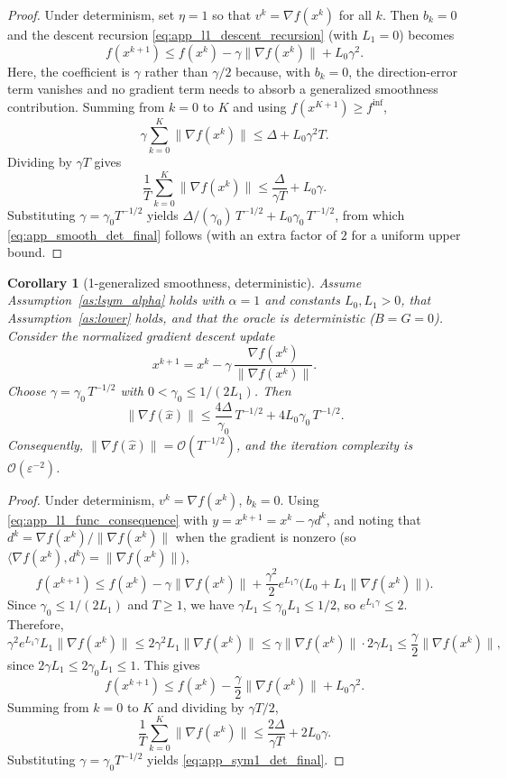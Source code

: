 \documentclass[letter,11pt]{article}
\newtheorem{corollary}{Corollary}[theorem]
\newcommand{\Ocal}{\mathcal{O}}
\begin{document}
\begin{proof}
Under determinism, set $\eta=1$ so that $v^k=\nabla f(x^k)$ for all $k$.
Then $b_k=0$ and the descent recursion
\eqref{eq:app_l1_descent_recursion} (with $L_1=0$) becomes
\[
    f(x^{k+1})
    \le f(x^k) - \gamma\|\nabla f(x^k)\| + L_0\gamma^2.
\]
Here, the coefficient is $\gamma$ rather than $\gamma/2$ because, with
$b_k=0$, the direction-error term vanishes and no gradient term needs to
absorb a generalized smoothness contribution. Summing from $k=0$ to $K$
and using $f(x^{K+1})\ge f^{\inf}$,
\[
    \gamma\sum_{k=0}^K \|\nabla f(x^k)\|
    \le \Delta + L_0\gamma^2 T.
\]
Dividing by $\gamma T$ gives
\[
    \frac{1}{T}\sum_{k=0}^K \|\nabla f(x^k)\|
    \le \frac{\Delta}{\gamma T} + L_0\gamma.
\]
Substituting $\gamma=\gamma_0 T^{-1/2}$ yields
$\Delta/(\gamma_0)\,T^{-1/2} + L_0\gamma_0\,T^{-1/2}$, from which
\eqref{eq:app_smooth_det_final} follows (with an extra factor of $2$ for
a uniform upper bound.
\end{proof}

\begin{corollary}[1-generalized smoothness, deterministic]
\label{cor:app_nsgdm_sym1_det}
Assume Assumption~\ref{as:lsym_alpha} holds with $\alpha=1$ and constants
$L_0,L_1>0$, that Assumption~\ref{as:lower} holds, and that the oracle is
deterministic ($B=G=0$). Consider the normalized gradient descent update
\[
    x^{k+1} = x^k - \gamma\,\frac{\nabla f(x^k)}{\|\nabla f(x^k)\|}.
\]
Choose $\gamma = \gamma_0\,T^{-1/2}$ with
$0<\gamma_0\le 1/(2L_1)$. Then
\begin{equation}
\label{eq:app_sym1_det_final}
    \|\nabla f(\widehat x)\|
    \le
    \frac{4\Delta}{\gamma_0}\,T^{-1/2}
    + 4L_0\gamma_0\,T^{-1/2}.
\end{equation}
Consequently,
$\|\nabla f(\widehat x)\| = \Ocal(T^{-1/2})$,
and the iteration complexity is $\Ocal(\varepsilon^{-2})$.
\end{corollary}

\begin{proof}
Under determinism, $v^k=\nabla f(x^k)$, $b_k=0$.
Using \eqref{eq:app_l1_func_consequence} with $y=x^{k+1}=x^k-\gamma d^k$,
and noting that $d^k=\nabla f(x^k)/\|\nabla f(x^k)\|$ when the gradient is
nonzero (so $\langle\nabla f(x^k),d^k\rangle=\|\nabla f(x^k)\|$),
\[
    f(x^{k+1})
    \le f(x^k)
    - \gamma\|\nabla f(x^k)\|
    + \frac{\gamma^2}{2}e^{L_1\gamma}
    \bigl(L_0+L_1\|\nabla f(x^k)\|\bigr).
\]
Since $\gamma_0\le 1/(2L_1)$ and $T\ge1$, we have
$\gamma L_1\le\gamma_0 L_1\le 1/2$, so $e^{L_1\gamma}\le 2$. Therefore,
\[
    \gamma^2 e^{L_1\gamma}L_1\|\nabla f(x^k)\|
    \le 2\gamma^2 L_1\|\nabla f(x^k)\|
    \le \gamma\|\nabla f(x^k)\|\cdot 2\gamma L_1
    \le \frac{\gamma}{2}\|\nabla f(x^k)\|,
\]
since $2\gamma L_1\le 2\gamma_0 L_1\le 1$. This gives
\[
    f(x^{k+1})
    \le f(x^k)
    - \frac{\gamma}{2}\|\nabla f(x^k)\|
    + L_0\gamma^2.
\]
Summing from $k=0$ to $K$ and dividing by $\gamma T/2$,
\[
    \frac{1}{T}\sum_{k=0}^K \|\nabla f(x^k)\|
    \le \frac{2\Delta}{\gamma T} + 2L_0\gamma.
\]
Substituting $\gamma=\gamma_0 T^{-1/2}$ yields
\eqref{eq:app_sym1_det_final}.
\end{proof}
\end{document}
